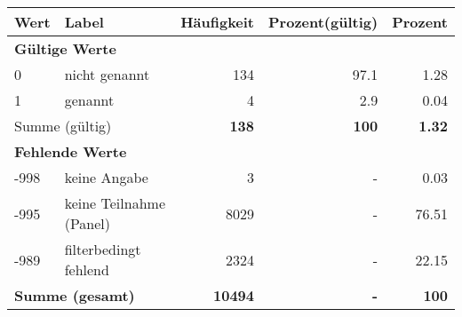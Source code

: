      \begin{longtable}{lXrrr}
     \toprule
     \textbf{Wert} & \textbf{Label} & \textbf{Häufigkeit} & \textbf{Prozent(gültig)} & \textbf{Prozent} \\
     \endhead
     \midrule
     \multicolumn{5}{l}{\textbf{Gültige Werte}}\\

     0 &
     \multicolumn{1}{X}{ nicht genannt   } &


       \num{134} &
       \num[round-mode=places,round-precision=2]{97.1} &
         \num[round-mode=places,round-precision=2]{1.28} \\

     1 &
     \multicolumn{1}{X}{ genannt   } &


       \num{4} &
       \num[round-mode=places,round-precision=2]{2.9} &
         \num[round-mode=places,round-precision=2]{0.04} \\
     \midrule
     \multicolumn{2}{l}{Summe (gültig)} &
       \textbf{\num{138}} &
     \textbf{\num{100}} &
       \textbf{\num[round-mode=places,round-precision=2]{1.32}} \\
     \multicolumn{5}{l}{\textbf{Fehlende Werte}}\\
       -998 &
       keine Angabe &
         \num{3} &
        - &
         \num[round-mode=places,round-precision=2]{0.03} \\
       -995 &
       keine Teilnahme (Panel) &
         \num{8029} &
        - &
         \num[round-mode=places,round-precision=2]{76.51} \\
       -989 &
       filterbedingt fehlend &
         \num{2324} &
        - &
         \num[round-mode=places,round-precision=2]{22.15} \\
     \midrule
     \multicolumn{2}{l}{\textbf{Summe (gesamt)}} &
          \textbf{\num{10494}} &
        \textbf{-} &
        \textbf{\num{100}} \\
     \bottomrule
     \end{longtable}
     

